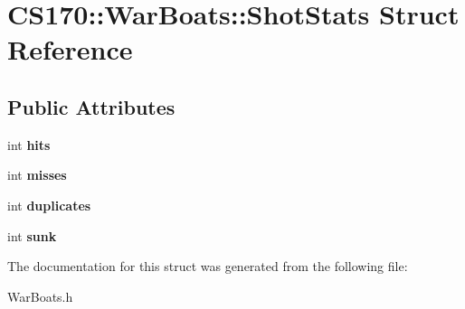 \hypertarget{struct_c_s170_1_1_war_boats_1_1_shot_stats}{\section{C\-S170\-:\-:War\-Boats\-:\-:Shot\-Stats Struct Reference}
\label{struct_c_s170_1_1_war_boats_1_1_shot_stats}
}
\subsection*{Public Attributes}
\begin{DoxyCompactItemize}
\item 
\hypertarget{struct_c_s170_1_1_war_boats_1_1_shot_stats_ac8117e4f3dcc2d880abe73cbda2c7d94}{int {\bfseries hits}}\label{struct_c_s170_1_1_war_boats_1_1_shot_stats_ac8117e4f3dcc2d880abe73cbda2c7d94}

\item 
\hypertarget{struct_c_s170_1_1_war_boats_1_1_shot_stats_a22c6e0365696cf2faf8fda8ff28ded65}{int {\bfseries misses}}\label{struct_c_s170_1_1_war_boats_1_1_shot_stats_a22c6e0365696cf2faf8fda8ff28ded65}

\item 
\hypertarget{struct_c_s170_1_1_war_boats_1_1_shot_stats_aed5a5ae3503fda1b3668bce0d1c38fe2}{int {\bfseries duplicates}}\label{struct_c_s170_1_1_war_boats_1_1_shot_stats_aed5a5ae3503fda1b3668bce0d1c38fe2}

\item 
\hypertarget{struct_c_s170_1_1_war_boats_1_1_shot_stats_aed1b336cc471f204ccc0bec7e02344ef}{int {\bfseries sunk}}\label{struct_c_s170_1_1_war_boats_1_1_shot_stats_aed1b336cc471f204ccc0bec7e02344ef}

\end{DoxyCompactItemize}


The documentation for this struct was generated from the following file\-:\begin{DoxyCompactItemize}
\item 
War\-Boats.\-h\end{DoxyCompactItemize}
